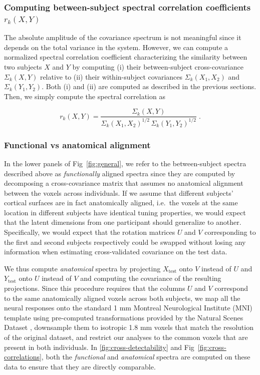 \documentclass[10pt]{article}
\begin{document}
\subsubsection{\texorpdfstring{Computing between-subject spectral correlation coefficients \(r_k(X, Y)\)}{Computing between-subject spectral correlation coefficients r\_k(X, Y)}}\label{computing-between-subject-spectral-correlation-coefficients-r_kx-y}

The absolute amplitude of the covariance spectrum is not meaningful since it depends on the total variance in the system. However, we can compute a normalized spectral correlation coefficient characterizing the similarity between two subjects \(X\) and \(Y\) by computing (i) their between-subject cross-covariance \(\Sigma_k(X, Y)\) relative to (ii) their within-subject covariances \(\Sigma_k(X_1, X_2)\) and \(\Sigma_k(Y_1, Y_2)\). Both (i) and (ii) are computed as described in the previous sections. Then, we simply compute the spectral correlation as

\[
r_k(X, Y) = \frac{\Sigma_k(X, Y)}{\Sigma_k(X_1, X_2)^{1/2}\, \Sigma_k(Y_1, Y_2)^{1/2}}\;.
\]

\subsubsection{Functional vs anatomical alignment}\label{functional-vs-anatomical-alignment}

In the lower panels of Fig~\ref{fig:general}, we refer to the between-subject spectra described above as \emph{functionally} aligned spectra since they are computed by decomposing a cross-covariance matrix that assumes no anatomical alignment between the voxels across individuals. If we assume that different subjects' cortical surfaces are in fact anatomically aligned, i.e.~the voxels at the same location in different subjects have identical tuning properties, we would expect that the latent dimensions from one participant should generalize to another. Specifically, we would expect that the rotation matrices \(U\) and \(V\) corresponding to the first and second subjects respectively could be swapped without losing any information when estimating cross-validated covariance on the test data.

We thus compute \emph{anatomical} spectra by projecting \(X_\text{test}\) onto \(V\) instead of \(U\) and \(Y_\text{test}\) onto \(U\) instead of \(V\) and computing the covariance of the resulting projections. Since this procedure requires that the columns \(U\) and \(V\) correspond to the same anatomically aligned voxels across both subjects, we map all the neural responses onto the standard 1 mm Montreal Neurological Institute (MNI) template using pre-computed transformations provided by the Natural Scenes Dataset \autocite{Allen2021}, downsample them to isotropic 1.8 mm voxels that match the resolution of the original dataset, and restrict our analyses to the common voxels that are present in both individuals. In \ref{fig:cross-detectability} and Fig~\ref{fig:cross-correlations}, both the \emph{functional} and \emph{anatomical} spectra are computed on these data to ensure that they are directly comparable.
\end{document}
